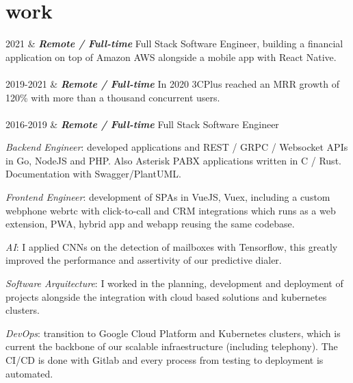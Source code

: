 \documentclass[]{cv-mauri}
\begin{document}
\section*{work}
\begin{tabularcv}
	2021   &   
					\textbf{\textit{Remote / Full-time}}
					\newline
			Full Stack Software Engineer, building a financial application on top of Amazon AWS alongside a mobile app with React Native.
					\\[\vspacepar]
					\\[\vspacepar]
	
    2019-2021   &   
                    \textbf{\textit{Remote / Full-time}}
                    \newline
		    In 2020 3CPlus reached an MRR growth of 120\% with more than a thousand concurrent users.
                    \\[\vspacepar]
                    \\[\vspacepar]
    2016-2019   &   
		    		\textbf{\textit{Remote / Full-time}}
		    		\newline
		    Full Stack Software Engineer
		    
		    \textit{Backend Engineer}: developed applications and REST / GRPC / Websocket APIs in Go, NodeJS and PHP. Also Asterisk PABX applications written in C / Rust. Documentation with Swagger/PlantUML.
		    
		    \textit{Frontend Engineer}: development of SPAs in VueJS, Vuex, including a custom webphone webrtc with click-to-call and CRM integrations which runs as a web extension, PWA, hybrid app and webapp reusing the same codebase.
		    
		    \textit{AI}: I applied CNNs on the detection of mailboxes with Tensorflow, this greatly improved the performance and assertivity of our predictive dialer.
		    
		    \textit{Software Arquitecture}: I worked in the planning, development and deployment of projects alongside the integration with cloud based solutions and kubernetes clusters.
		    
		    \textit{DevOps}: transition to Google Cloud Platform and Kubernetes clusters, which is current the backbone of our scalable infraestructure (including telephony). The CI/CD is done with Gitlab and every process from testing to deployment is automated.


\end{tabularcv}
\end{document}
